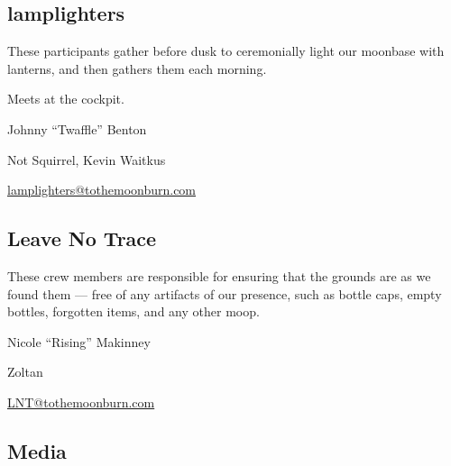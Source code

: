 

\subsection*{\Gls{lamplighters}}
These participants gather before dusk to ceremonially light our moonbase with lanterns, and then gathers them each morning.   

Meets at the \gls{cockpit}.

\begin{description}[leftmargin=6em,noitemsep,style=nextline]
   \item[Lead:] Johnny ``Twaffle'' Benton
   \item[Co-leads:] Not Squirrel, Kevin Waitkus
   \item[Contact:] \url{lamplighters@tothemoonburn.com}
\end{description}


\subsection*{Leave No Trace}
These crew members are responsible for ensuring that the grounds are as we found them --- free of any artifacts of our presence, such as bottle caps, empty bottles, forgotten items, and any other \gls{moop}.

\begin{description}[leftmargin=6em,noitemsep,style=nextline]
   \item[Lead:] Nicole ``Rising'' Makinney
   \item[Co-leads:] Zoltan
   \item[Contact:] \url{LNT@tothemoonburn.com}
\end{description}


\subsection*{Media}

